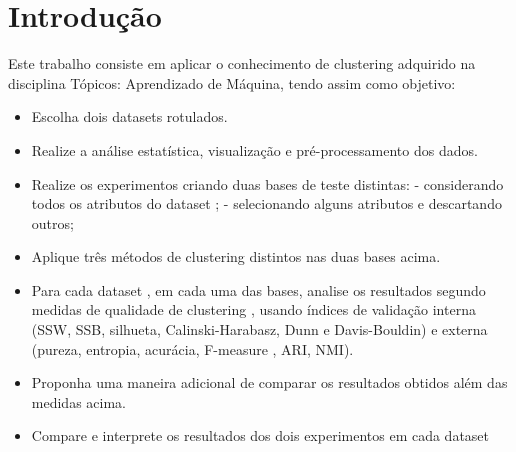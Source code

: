\chapter{Introdução}\label{cap_intro}

Este trabalho consiste em aplicar o conhecimento de clustering adquirido na disciplina Tópicos: Aprendizado de Máquina, tendo assim como objetivo:

\begin{itemize}
	\item Escolha dois datasets rotulados.
	
	\item Realize a análise estatística, visualização e pré-processamento dos dados.
	
	\item Realize os experimentos criando duas bases de teste distintas:
	\subitem - considerando todos os atributos do dataset ;
	\subitem - selecionando alguns atributos e descartando outros;
	
	\item Aplique três métodos de clustering distintos nas duas bases acima.
	
	\item Para cada dataset , em cada uma das bases, analise os resultados
	segundo medidas de qualidade de clustering , usando índices de
	validação interna (SSW, SSB, silhueta, Calinski-Harabasz, Dunn e
	Davis-Bouldin) e externa (pureza, entropia, acurácia, F-measure ,
	ARI, NMI).
	
	\item Proponha uma maneira adicional de comparar os resultados obtidos
	além das medidas acima.
	
	\item Compare e interprete os resultados dos dois experimentos em cada dataset
\end{itemize}
